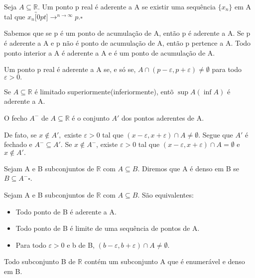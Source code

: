 \documentclass[Analysis/analysis_notes.tex]{subfiles}
\begin{document}
\begin{def*}
	Seja $A\subseteq{\mathbb{R}}$. Um ponto p real \'e aderente a A se existir uma sequ\^encia $\{x_{n}\}$ em A tal que $x_{n}\overbracket[0pt]{\longrightarrow}^{n\to \infty}p.\square$
\end{def*}
Sabemos que se p \'e um ponto de acumula\c c\~ao de A, ent\~ao p \'e aderente a A. Se p \'e aderente a A e p n\~ao \'e ponto de acumula\c c\~ao de A, ent\~ao
p pertence a A. Todo ponto interior a A \'e aderente a A e \'e um ponto de acumula\c c\~ao de A.
\begin{theorem*}
	Um ponto p real \'e aderente a A se, e s\'o se, $A\cap{(p-\varepsilon , p+\varepsilon )}\neq\emptyset$ para todo $\varepsilon  > 0.$
\end{theorem*}
\begin{crl*}
	Se $A\subseteq{\mathbb{R}}$ \'e limitado superiormente(inferiormente), ent\~o $\sup{A}(\inf{A})$ \'e aderente a A.
\end{crl*}
\begin{theorem*}
	O fecho $A^{-}$ de $A\subseteq{\mathbb{R}}$ \'e o conjunto $A'$ dos pontos aderentes de A.
\end{theorem*}
\begin{proof*}
	De fato, se $x\not\in A',$ existe $\varepsilon >0$ tal que $(x-\varepsilon ,x+\varepsilon )\cap{A}\neq\emptyset$. Segue que
	$A'$ \'e fechado e $A^{-}\subseteq{A'}$. Se $x\not\in A^{-}$, existe $\varepsilon >0$ tal que $(x-\varepsilon ,x+\varepsilon )\cap{A}=\emptyset$
	e $x\not\in A'.$ \qedsymbol
\end{proof*}
\begin{def*}
	Sejam A e B subconjuntos de $\mathbb{R}$ com $A\subseteq{B}.$ Diremos que A \'e denso em B se $B\subseteq{A^{-}}\square$.
\end{def*}
\begin{theorem*}
	Sejam A e B subconjuntos de $\mathbb{R}$ com $A\subseteq{B}$. S\~ao equivalentes:
	\begin{itemize}
		\item Todo ponto de B \'e aderente a A.
		\item Todo ponto de B \'e limite de uma sequ\^encia de pontos de A.
		\item Para todo $\varepsilon >0$ e b de B, $(b-\varepsilon , b+\varepsilon )\cap{A}\neq\emptyset.$
	\end{itemize}
\end{theorem*}
\begin{theorem*}
	Todo subconjunto B de $\mathbb{R}$ cont\'em um subconjunto A que \'e enumer\'avel e denso em B.
\end{theorem*}
\end{document}
